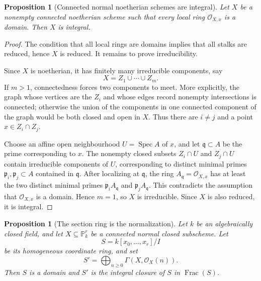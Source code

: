 \documentclass[11pt]{amsart}
\DeclareMathOperator{\Spec}{Spec}
\DeclareMathOperator{\Frac}{Frac}
\newcommand{\OO}{\mathcal O}
\theoremstyle{plain}
\newtheorem{proposition}[theorem]{Proposition}
\theoremstyle{definition}
\theoremstyle{remark}
\begin{document}
\begin{proposition}[Connected normal noetherian schemes are integral]\label{prop:connected-normal-integral}
Let $X$ be a nonempty connected noetherian scheme such that every local ring $\OO_{X,x}$ is a domain. Then $X$ is integral.
\end{proposition}

\begin{proof}
The condition that all local rings are domains implies that all stalks are reduced, hence $X$ is reduced.  It remains to prove irreducibility.

Since $X$ is noetherian, it has finitely many irreducible components, say
\[
  X = Z_1\cup\cdots\cup Z_m.
\]
If $m>1$, connectedness forces two components to meet.  More explicitly, the graph whose vertices are the $Z_i$ and whose edges record nonempty intersections is connected; otherwise the union of the components in one connected component of the graph would be both closed and open in $X$.  Thus there are $i\neq j$ and a point $x\in Z_i\cap Z_j$.

Choose an affine open neighbourhood $U=\Spec A$ of $x$, and let $\mathfrak q\subset A$ be the prime corresponding to $x$.  The nonempty closed subsets $Z_i\cap U$ and $Z_j\cap U$ contain irreducible components of $U$, corresponding to distinct minimal primes $\mathfrak p_i,\mathfrak p_j\subset A$ contained in $\mathfrak q$.  After localizing at $\mathfrak q$, the ring $A_{\mathfrak q}=\OO_{X,x}$ has at least the two distinct minimal primes $\mathfrak p_iA_{\mathfrak q}$ and $\mathfrak p_jA_{\mathfrak q}$.  This contradicts the assumption that $\OO_{X,x}$ is a domain.  Hence $m=1$, so $X$ is irreducible.  Since $X$ is also reduced, it is integral.
\end{proof}

\begin{proposition}[The section ring is the normalization]\label{prop:section-ring-normalization}
Let $k$ be an algebraically closed field, and let $X\subseteq \mathbb P^r_k$ be a connected normal closed subscheme.  Let
\[
  S = k[x_0,\ldots,x_r]/I
\]
be its homogeneous coordinate ring, and set
\[
  S' = \bigoplus_{n\geq 0} \Gamma(X,\OO_X(n)).
\]
Then $S$ is a domain and $S'$ is the integral closure of $S$ in $\Frac(S)$.
\end{proposition}
\end{document}

